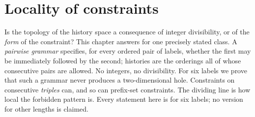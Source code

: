 \chapter{Locality of constraints}\label{ch:locality}

Is the topology of the history space a consequence of integer divisibility, or of the \emph{form} of the constraint? This chapter answers for one precisely stated class. A \emph{pairwise grammar} specifies, for every ordered pair of labels, whether the first may be immediately followed by the second; histories are the orderings all of whose consecutive pairs are allowed. No integers, no divisibility. For six labels we prove that such a grammar never produces a two-dimensional hole. Constraints on consecutive \emph{triples} can, and so can prefix-set constraints. The dividing line is how local the forbidden pattern is. Every statement here is for six labels; no version for other lengths is claimed.

